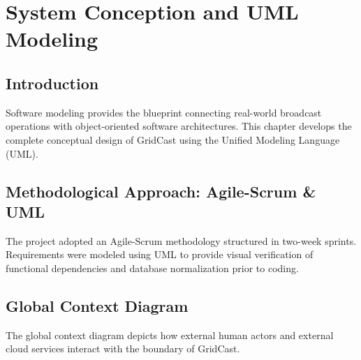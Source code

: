 \documentclass[12pt,a4paper,oneside]{report}
\begin{document}
\chapter{System Conception and UML Modeling}
\label{chap:conception}

\section{Introduction}
Software modeling provides the blueprint connecting real-world broadcast operations with object-oriented software architectures. This chapter develops the complete conceptual design of GridCast using the Unified Modeling Language (UML).

\section{Methodological Approach: Agile-Scrum \& UML}
The project adopted an Agile-Scrum methodology structured in two-week sprints. Requirements were modeled using UML to provide visual verification of functional dependencies and database normalization prior to coding.

\section{Global Context Diagram}
The global context diagram depicts how external human actors and external cloud services interact with the boundary of GridCast.
\end{document}
